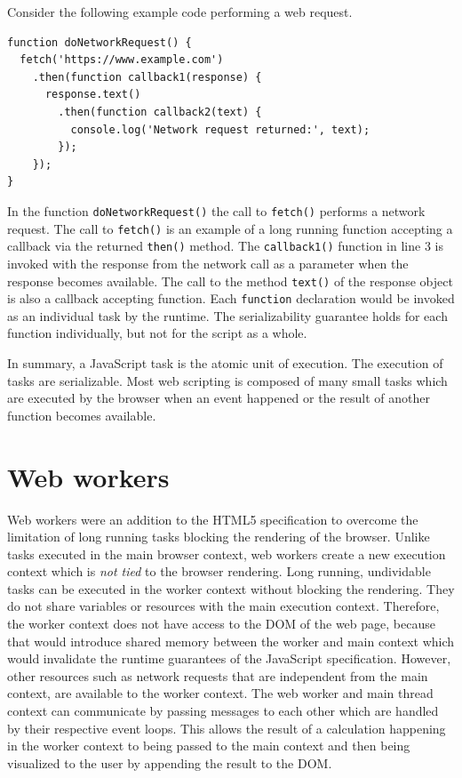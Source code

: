 \documentclass[
	ruledheaders=section,%
	class=report,%
	thesis={type=bachelor},%
	accentcolor=9c,%
	custommargins=true,%
	marginpar=false,%
	parskip=half-,%
	fontsize=11pt,%
]{tudapub}
\begin{document}
  Consider the following example code performing a web request.
\begin{lstlisting}
function doNetworkRequest() {
  fetch('https://www.example.com')
    .then(function callback1(response) {
      response.text()
        .then(function callback2(text) {
          console.log('Network request returned:', text);
        });
    });
}
\end{lstlisting}
  In the function \texttt{doNetworkRequest()} the call to \texttt{fetch()} performs a network request. The call to \texttt{fetch()} is an example of a long running function accepting a callback via the returned \texttt{then()} method. The \texttt{callback1()} function in line 3 is invoked with the response from the network call as a parameter when the response becomes available. The call to the method \texttt{text()} of the response object is also a callback accepting function. Each \texttt{function} declaration would be invoked as an individual task by the runtime. The serializability guarantee holds for each function individually, but not for the script as a whole.

  In summary, a JavaScript task is the atomic unit of execution. The execution of tasks are serializable. Most web scripting is composed of many small tasks which are executed by the browser when an event happened or the result of another function becomes available.
  
  \section{Web workers}
  \label{sec:web-workers}

  Web workers were an addition to the HTML5 specification to overcome the limitation of long running tasks blocking the rendering of the browser. Unlike tasks executed in the main browser context, web workers create a new execution context which is \textit{not tied} to the browser rendering. Long running, undividable tasks can be executed in the worker context without blocking the rendering. They do not share variables or resources with the main execution context. Therefore, the worker context does not have access to the DOM of the web page, because that would introduce shared memory between the worker and main context which would invalidate the runtime guarantees of the JavaScript specification. However, other resources such as network requests that are independent from the main context, are available to the worker context. The web worker and main thread context can communicate by passing messages to each other which are handled by their respective event loops. This allows the result of a calculation happening in the worker context to being passed to the main context and then being visualized to the user by appending the result to the DOM.
\end{document}
